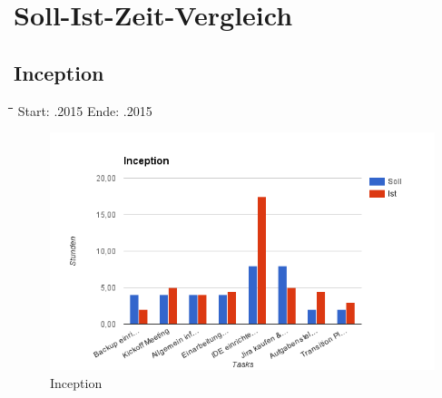 \section{Soll-Ist-Zeit-Vergleich}

\subsection{Inception}
\begin{tabbing}[H]
    \hspace*{3cm}\=\hspace*{5cm}\=\hspace*{3cm}\=\hspace*{3cm}\= \kill
    Start: .2015 \>	Ende: .2015 \\
\end{tabbing}
\begin{figure}[H]
\centering
\includegraphics[width=390pt]{images/inception.png}
\caption[Inception]{Inception}
\end{figure}
\newpage
